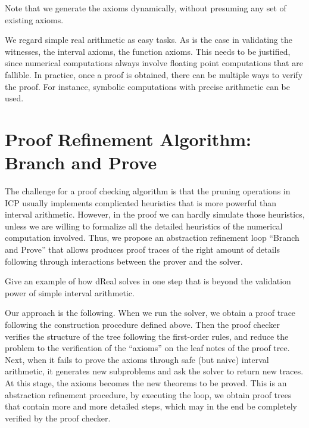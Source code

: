 \documentclass[envcountsect]{llncs}
\begin{document}
\begin{remark}
Note that we generate the axioms dynamically, without presuming any set of
existing axioms.  
\end{remark}

\begin{remark}
We regard simple real arithmetic as easy tasks.
As is the case in validating the witnesses, the interval axioms, the function
axioms. This needs to be justified, since numerical computations always involve
floating point computations that are fallible. In practice, once a proof is
obtained, there can be multiple ways to verify the proof. For instance, symbolic
computations with precise arithmetic can be used.
\end{remark}

\section{Proof Refinement Algorithm: Branch and Prove}

The challenge for a proof checking algorithm is that the pruning operations in
ICP usually implements complicated heuristics that is more powerful than
interval arithmetic. However, in the proof we can hardly simulate those
heuristics, unless we are willing to formalize all the detailed heuristics of
the numerical computation involved. Thus, we propose an abstraction refinement
loop ``Branch and Prove'' that allows produces proof traces of the right amount
of details following through interactions between the prover and the solver. 

\begin{example}
Give an example of how dReal solves in one step that is beyond the validation
power of simple interval arithmetic.
\end{example}

Our approach is the following. When we run the solver, we obtain a proof trace
following the construction procedure defined above. Then the proof checker
verifies the structure of the tree following the first-order rules, and reduce
the problem to the verification of the ``axioms'' on the leaf notes of the
proof tree. Next, when it fails to prove the axioms through safe (but naive)
interval arithmetic, it generates new subproblems and ask the solver to return
new traces. At this stage, the axioms becomes the new theorems to be proved.
This is an abstraction refinement procedure, by executing the loop, we obtain
proof trees that contain more and more detailed steps, which may in the end be
completely verified by the proof checker. 
\end{document}
